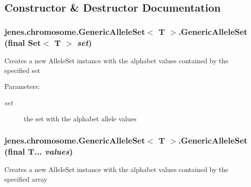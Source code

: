 \subsection{Constructor \& Destructor Documentation}
\hypertarget{classjenes_1_1chromosome_1_1_generic_allele_set_3_01_t_01_4_fc6f6f35af245d54ba7ad6f57a9a3893}{
\subsubsection[GenericAlleleSet]{\setlength{\rightskip}{0pt plus 5cm}jenes.chromosome.GenericAlleleSet$<$ T $>$.GenericAlleleSet (final Set$<$ T $>$ {\em set})}}
\label{classjenes_1_1chromosome_1_1_generic_allele_set_3_01_t_01_4_fc6f6f35af245d54ba7ad6f57a9a3893}


Creates a new AlleleSet instance with the alphabet values contained by the specified set 

\begin{Desc}
\item[Parameters:]
\begin{description}
\item[{\em set}]the set with the alphabet allele values \end{description}
\end{Desc}
\hypertarget{classjenes_1_1chromosome_1_1_generic_allele_set_3_01_t_01_4_e7a1970427bae039c3f4ae6340b53ca7}{
\subsubsection[GenericAlleleSet]{\setlength{\rightskip}{0pt plus 5cm}jenes.chromosome.GenericAlleleSet$<$ T $>$.GenericAlleleSet (final T... {\em values})}}
\label{classjenes_1_1chromosome_1_1_generic_allele_set_3_01_t_01_4_e7a1970427bae039c3f4ae6340b53ca7}


Creates a new AlleleSet instance with the alphabet values contained by the specified array 

